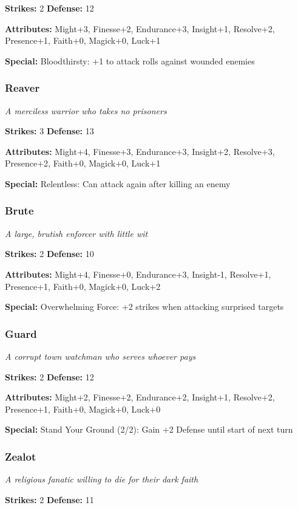 \documentclass[10pt,twoside]{article}
\begin{document}
\textbf{Strikes:} 2 \quad \textbf{Defense:} 12

\textbf{Attributes:} Might+3, Finesse+2, Endurance+3, Insight+1, Resolve+2, Presence+1, Faith+0, Magick+0, Luck+1

\textbf{Special:} Bloodthirsty: +1 to attack rolls against wounded enemies

\subsubsection{Reaver}
\textit{A merciless warrior who takes no prisoners}

\textbf{Strikes:} 3 \quad \textbf{Defense:} 13

\textbf{Attributes:} Might+4, Finesse+3, Endurance+3, Insight+2, Resolve+3, Presence+2, Faith+0, Magick+0, Luck+1

\textbf{Special:} Relentless: Can attack again after killing an enemy

\subsubsection{Brute}
\textit{A large, brutish enforcer with little wit}

\textbf{Strikes:} 2 \quad \textbf{Defense:} 10

\textbf{Attributes:} Might+4, Finesse+0, Endurance+3, Insight-1, Resolve+1, Presence+1, Faith+0, Magick+0, Luck+2

\textbf{Special:} Overwhelming Force: +2 strikes when attacking surprised targets

\subsubsection{Guard}
\textit{A corrupt town watchman who serves whoever pays}

\textbf{Strikes:} 2 \quad \textbf{Defense:} 12

\textbf{Attributes:} Might+2, Finesse+2, Endurance+2, Insight+1, Resolve+2, Presence+1, Faith+0, Magick+0, Luck+0

\textbf{Special:} Stand Your Ground (2/2): Gain +2 Defense until start of next turn

\subsubsection{Zealot}
\textit{A religious fanatic willing to die for their dark faith}

\textbf{Strikes:} 2 \quad \textbf{Defense:} 11
\end{document}
